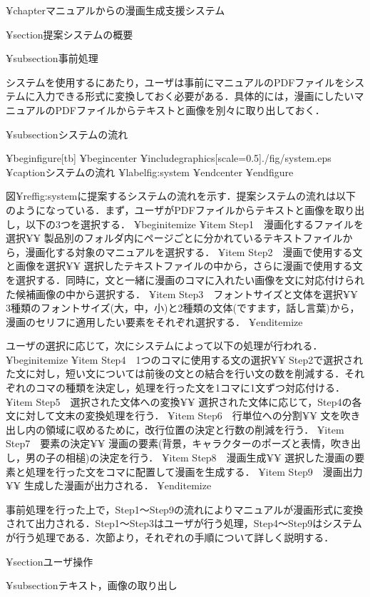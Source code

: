 ¥chapter{マニュアルからの漫画生成支援システム}

¥section{提案システムの概要}

¥subsection{事前処理}

システムを使用するにあたり，ユーザは事前にマニュアルのPDFファイルをシステムに入力できる形式に変換しておく必要がある．具体的には，漫画にしたいマニュアルのPDFファイルからテキストと画像を別々に取り出しておく．

¥subsection{システムの流れ}

¥begin{figure}[tb]
 ¥begin{center}
  ¥includegraphics[scale=0.5]{./fig/system.eps}
  ¥caption{システムの流れ}
  ¥label{fig:system}
 ¥end{center}
¥end{figure}

図¥ref{fig:system}に提案するシステムの流れを示す．提案システムの流れは以下のようになっている．まず，ユーザがPDFファイルからテキストと画像を取り出し，以下の3つを選択する．
¥begin{itemize}
¥item Step1　漫画化するファイルを選択¥¥
製品別のフォルダ内にページごとに分かれているテキストファイルから，漫画化する対象のマニュアルを選択する．
¥item Step2　漫画で使用する文と画像を選択¥¥
選択したテキストファイルの中から，さらに漫画で使用する文を選択する．同時に，文と一緒に漫画のコマに入れたい画像を文に対応付けられた候補画像の中から選択する．
¥item Step3　フォントサイズと文体を選択¥¥
3種類のフォントサイズ(大，中，小)と2種類の文体(ですます，話し言葉)から，漫画のセリフに適用したい要素をそれぞれ選択する．
¥end{itemize}

ユーザの選択に応じて，次にシステムによって以下の処理が行われる．
¥begin{itemize}
¥item Step4　1つのコマに使用する文の選択¥¥
Step2で選択された文に対し，短い文については前後の文との結合を行い文の数を削減する．それぞれのコマの種類を決定し，処理を行った文を1コマに1文ずつ対応付ける．
¥item Step5　選択された文体への変換¥¥
選択された文体に応じて，Step4の各文に対して文末の変換処理を行う．
¥item Step6　行単位への分割¥¥
文を吹き出し内の領域に収めるために，改行位置の決定と行数の削減を行う．
¥item Step7　要素の決定¥¥
漫画の要素(背景，キャラクターのポーズと表情，吹き出し，男の子の相槌)の決定を行う．
¥item Step8　漫画生成¥¥
選択した漫画の要素と処理を行った文をコマに配置して漫画を生成する．
¥item Step9　漫画出力¥¥
生成した漫画が出力される．
¥end{itemize}

事前処理を行った上で，Step1〜Step9の流れによりマニュアルが漫画形式に変換されて出力される．Step1〜Step3はユーザが行う処理，Step4〜Step9はシステムが行う処理である．次節より，それぞれの手順について詳しく説明する．

¥section{ユーザ操作}

¥subsection{テキスト，画像の取り出し}

